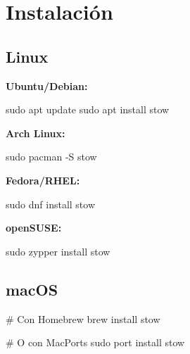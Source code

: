 \documentclass[
  doc,
  floatsintext,
  longtable,
  a4paper,
  nolmodern,
  notxfonts,
  notimes,
  12pt,
  colorlinks=true,linkcolor=blue,citecolor=blue,urlcolor=blue]{apa7}
\newenvironment{Shaded}{\begin{snugshade}}{\end{snugshade}}
\newcommand{\AttributeTok}[1]{\textcolor[rgb]{0.40,0.45,0.13}{#1}}
\newcommand{\CommentTok}[1]{\textcolor[rgb]{0.37,0.37,0.37}{#1}}
\newcommand{\ExtensionTok}[1]{\textcolor[rgb]{0.00,0.23,0.31}{#1}}
\newcommand{\FunctionTok}[1]{\textcolor[rgb]{0.28,0.35,0.67}{#1}}
\newcommand{\NormalTok}[1]{\textcolor[rgb]{0.00,0.23,0.31}{#1}}
\begin{document}
\section{Instalación}\label{instalaciuxf3n}

\subsection{Linux}\label{linux}

\textbf{Ubuntu/Debian:}

\begin{Shaded}
\begin{Highlighting}[]
\FunctionTok{sudo}\NormalTok{ apt update}
\FunctionTok{sudo}\NormalTok{ apt install stow}
\end{Highlighting}
\end{Shaded}

\textbf{Arch Linux:}

\begin{Shaded}
\begin{Highlighting}[]
\FunctionTok{sudo}\NormalTok{ pacman }\AttributeTok{{-}S}\NormalTok{ stow}
\end{Highlighting}
\end{Shaded}

\textbf{Fedora/RHEL:}

\begin{Shaded}
\begin{Highlighting}[]
\FunctionTok{sudo}\NormalTok{ dnf install stow}
\end{Highlighting}
\end{Shaded}

\textbf{openSUSE:}

\begin{Shaded}
\begin{Highlighting}[]
\FunctionTok{sudo}\NormalTok{ zypper install stow}
\end{Highlighting}
\end{Shaded}

\subsection{macOS}\label{macos}

\begin{Shaded}
\begin{Highlighting}[]
\CommentTok{\# Con Homebrew}
\ExtensionTok{brew}\NormalTok{ install stow}

\CommentTok{\# O con MacPorts}
\FunctionTok{sudo}\NormalTok{ port install stow}
\end{Highlighting}
\end{Shaded}
\end{document}
